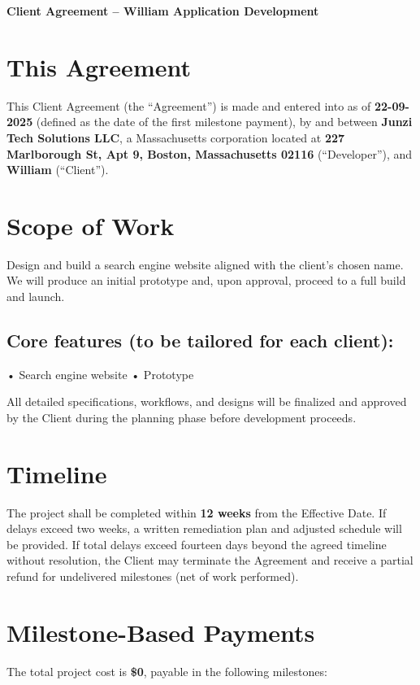 \documentclass[11pt,letterpaper]{article}
\newcommand{\ClientName}{William}
\newcommand{\AppName}{}
\newcommand{\EffectiveDate}{22-09-2025}
\newcommand{\TimeLine}{12 weeks}
\newcommand{\TotalCost}{0}
\newcommand{\FeaturesListPlaceholder}{• Search engine website
• Prototype}
\newcommand{\ScopeDescription}{Design and build a search engine website aligned with the client's chosen name. We will produce an initial prototype and, upon approval, proceed to a full build and launch.}
\begin{document}
\begin{center}
\Large\textbf{Client Agreement -- \ClientName{} \AppName{} Application Development}
\end{center}

\vspace{1em}

\section*{This Agreement}
This Client Agreement (the ``Agreement'') is made and entered into as of \textbf{\EffectiveDate{}} (defined as the date of the first milestone payment), by and between \textbf{Junzi Tech Solutions LLC}, a Massachusetts corporation located at \textbf{227 Marlborough St, Apt 9, Boston, Massachusetts 02116} (``Developer''), and \textbf{\ClientName{}} (``Client'').

\section{Scope of Work}
\ScopeDescription{}

\subsection*{Core features (to be tailored for each client):}
\FeaturesListPlaceholder{}

All detailed specifications, workflows, and designs will be finalized and approved by the Client during the planning phase before development proceeds.

\section{Timeline}
The project shall be completed within \textbf{\TimeLine{}} from the Effective Date. If delays exceed two weeks, a written remediation plan and adjusted schedule will be provided. If total delays exceed fourteen days beyond the agreed timeline without resolution, the Client may terminate the Agreement and receive a partial refund for undelivered milestones (net of work performed).

\section{Milestone-Based Payments}
The total project cost is \textbf{\$\TotalCost{}}, payable in the following milestones:
\end{document}
